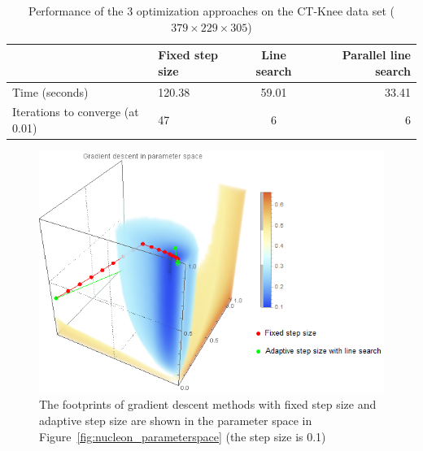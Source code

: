 \begin{table}[h]
	\begin{tabular}{ l | l c r }
		& Fixed step size & Line search & Parallel line search \\
		\hline
		Time (seconds) & 120.38 & 59.01 & 33.41 \\
		Iterations to converge (at 0.01) & 47 & 6 & 6 \\
	\end{tabular}
	\caption[Table caption text]{Performance of the 3 optimization approaches on the CT-Knee data set ($ 379 \times 229 \times 305 $)}
	\label{table:CT-Knee_table}
\end{table}

\begin{figure}
	\centering
	\begin{minipage}{.9\textwidth}
		\includegraphics[width=1\linewidth]{images/nucleon_strong_red_parameterspace_path}
	\end{minipage}
	\caption{The footprints of gradient descent methods with fixed step size and adaptive step size are shown in the parameter space in Figure~\ref{fig:nucleon_parameterspace} (the step size is 0.1)}
	\label{fig:nucleon_parameterspace_path}
\end{figure}

